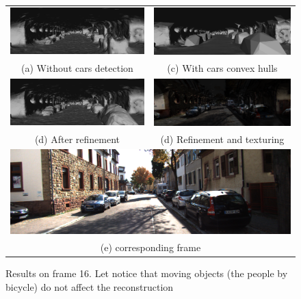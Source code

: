 \begin{figure}[tp]
 \centering
\setlength{\tabcolsep}{2px}
    \begin{tabular}{cc}
    \includegraphics[width=0.49\columnwidth]{./img/ch-laser/notCar01}&
    \includegraphics[width=0.49\columnwidth]{./img/ch-laser/onlyCar01}\\
    (a) Without cars detection&
    (c) With cars convex hulls\\
    \includegraphics[width=0.49\columnwidth]{./img/ch-laser/nottextured01}&
    \includegraphics[width=0.49\columnwidth]{./img/ch-laser/textured01}\\
    (d) After refinement&
    (d) Refinement and texturing\\
    \multicolumn{2}{c}{
    \includegraphics[width=0.98\columnwidth]{./img/ch-laser/0000000016}}\\
    \multicolumn{2}{c}{(e) corresponding frame}
 \end{tabular}
 \caption{Results on frame 16. Let notice that moving objects (the people by bicycle) do not affect the reconstruction}
 \label{fig:results06}
\end{figure}


